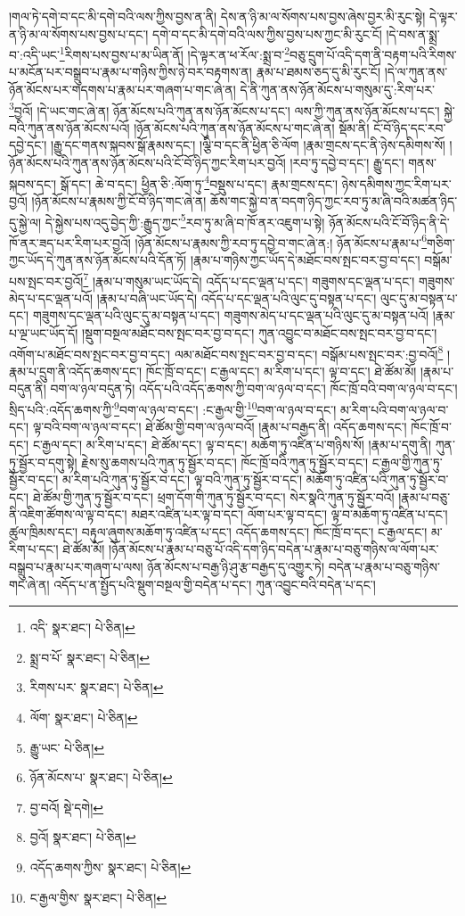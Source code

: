།གལ་ཏེ་དགེ་བ་དང་མི་དགེ་བའི་ལས་ཀྱིས་བྱས་ན་ནི། དེས་ན་ཉི་མ་ལ་སོགས་པས་བྱས་ཞེས་བྱར་མི་རུང་སྟེ། དེ་ལྟར་ན་ཉི་མ་ལ་སོགས་པས་བྱས་པ་དང་། དགེ་བ་དང་མི་དགེ་བའི་ལས་ཀྱིས་བྱས་པས་ཀྱང་མི་རུང་ངོ། །དེ་བས་ན་སྨྲ་བ་:འདི་ཡང་\footnote{འདི་  སྣར་ཐང་།  པེ་ཅིན། }རིགས་པས་བྱས་པ་མ་ཡིན་ནོ། །དེ་ལྟར་ན་ཕ་རོལ་:སྨྲ་བ་\footnote{སྨྲ་བ་པོ་  སྣར་ཐང་།  པེ་ཅིན། }བཅུ་དྲུག་པོ་འདི་དག་ནི་བརྟག་པའི་རིགས་པ་མངོན་པར་བསྒྲུབ་པ་རྣམ་པ་གཉིས་ཀྱིས་ཉེ་བར་བརྟགས་ན། རྣམ་པ་ཐམས་ཅད་དུ་མི་རུང་ངོ། །དེ་ལ་ཀུན་ནས་ཉོན་མོངས་པར་གདགས་པ་རྣམ་པར་གཞག་པ་གང་ཞེ་ན། དེ་ནི་ཀུན་ནས་ཉོན་མོངས་པ་གསུམ་དུ་:རིག་པར་\footnote{རིགས་པར་  སྣར་ཐང་།  པེ་ཅིན། }བྱའོ། །དེ་ཡང་གང་ཞེ་ན། ཉོན་མོངས་པའི་ཀུན་ནས་ཉོན་མོངས་པ་དང་། ལས་ཀྱི་ཀུན་ནས་ཉོན་མོངས་པ་དང་། སྐྱེ་བའི་ཀུན་ནས་ཉོན་མོངས་པའོ། །ཉོན་མོངས་པའི་ཀུན་ནས་ཉོན་མོངས་པ་གང་ཞེ་ན། སྡོམ་ནི། ངོ་བོ་ཉིད་དང་རབ་དབྱེ་དང་། །རྒྱུ་དང་གནས་སྐབས་སྒོ་རྣམས་དང་། །ལྕི་བ་དང་ནི་ཕྱིན་ཅི་ལོག །རྣམ་གྲངས་དང་ནི་ཉེས་དམིགས་སོ། །ཉོན་མོངས་པའི་ཀུན་ནས་ཉོན་མོངས་པའི་ངོ་བོ་ཉིད་ཀྱང་རིག་པར་བྱའོ། །རབ་ཏུ་དབྱེ་བ་དང་། རྒྱུ་དང་། གནས་སྐབས་དང་། སྒོ་དང་། ཆེ་བ་དང་། ཕྱིན་ཅི་:ལོག་ཏུ་\footnote{ལོག་  སྣར་ཐང་།  པེ་ཅིན། }བསྡུས་པ་དང་། རྣམ་གྲངས་དང་། ཉེས་དམིགས་ཀྱང་རིག་པར་བྱའོ། །ཉོན་མོངས་པ་རྣམས་ཀྱི་ངོ་བོ་ཉིད་གང་ཞེ་ན། ཆོས་གང་སྐྱེ་བ་ན་བདག་ཉིད་ཀྱང་རབ་ཏུ་མ་ཞི་བའི་མཚན་ཉིད་དུ་སྐྱེ་ལ། དེ་སྐྱེས་པས་འདུ་བྱེད་ཀྱི་:རྒྱུད་ཀྱང་\footnote{རྒྱུ་ཡང་  པེ་ཅིན། }རབ་ཏུ་མ་ཞི་བ་ཁོ་ནར་འཇུག་པ་སྟེ། ཉོན་མོངས་པའི་ངོ་བོ་ཉིད་ནི་དེ་ཁོ་ནར་ཟད་པར་རིག་པར་བྱའོ། །ཉོན་མོངས་པ་རྣམས་ཀྱི་རབ་ཏུ་དབྱེ་བ་གང་ཞེ་ན:། ཉོན་མོངས་པ་རྣམ་པ་\footnote{ཉོན་མོངས་པ་  སྣར་ཐང་།  པེ་ཅིན། }གཅིག་ཀྱང་ཡོད་དེ་ཀུན་ནས་ཉོན་མོངས་པའི་དོན་ཏོ། །རྣམ་པ་གཉིས་ཀྱང་ཡོད་དེ་མཐོང་བས་སྤང་བར་བྱ་བ་དང་། བསྒོམ་པས་སྤང་བར་བྱའོ།\footnote{བྱ་བའོ།  སྡེ་དགེ། } །རྣམ་པ་གསུམ་ཡང་ཡོད་དེ། འདོད་པ་དང་ལྡན་པ་དང་། གཟུགས་དང་ལྡན་པ་དང་། གཟུགས་མེད་པ་དང་ལྡན་པའོ། །རྣམ་པ་བཞི་ཡང་ཡོད་དེ། འདོད་པ་དང་ལྡན་པའི་ལུང་དུ་བསྟན་པ་དང་། ལུང་དུ་མ་བསྟན་པ་དང་། གཟུགས་དང་ལྡན་པའི་ལུང་དུ་མ་བསྟན་པ་དང་། གཟུགས་མེད་པ་དང་ལྡན་པའི་ལུང་དུ་མ་བསྟན་པའོ། །རྣམ་པ་ལྔ་ཡང་ཡོད་དོ། །སྡུག་བསྔལ་མཐོང་བས་སྤང་བར་བྱ་བ་དང་། ཀུན་འབྱུང་བ་མཐོང་བས་སྤང་བར་བྱ་བ་དང་། འགོག་པ་མཐོང་བས་སྤང་བར་བྱ་བ་དང་། ལམ་མཐོང་བས་སྤང་བར་བྱ་བ་དང་། བསྒོམ་པས་སྤང་བར་:བྱ་བའོ།\footnote{བྱའོ།  སྣར་ཐང་།  པེ་ཅིན། } །རྣམ་པ་དྲུག་ནི་འདོད་ཆགས་དང་། ཁོང་ཁྲོ་བ་དང་། ང་རྒྱལ་དང་། མ་རིག་པ་དང་། ལྟ་བ་དང་། ཐེ་ཚོམ་མོ། །རྣམ་པ་བདུན་ནི། བག་ལ་ཉལ་བདུན་ཏེ། འདོད་པའི་འདོད་ཆགས་ཀྱི་བག་ལ་ཉལ་བ་དང་། ཁོང་ཁྲོ་བའི་བག་ལ་ཉལ་བ་དང་། སྲིད་པའི་:འདོད་ཆགས་ཀྱི་\footnote{འདོད་ཆགས་ཀྱིས་  སྣར་ཐང་།  པེ་ཅིན། }བག་ལ་ཉལ་བ་དང་། :ང་རྒྱལ་གྱི་\footnote{ང་རྒྱལ་གྱིས་  སྣར་ཐང་།  པེ་ཅིན། }བག་ལ་ཉལ་བ་དང་། མ་རིག་པའི་བག་ལ་ཉལ་བ་དང་། ལྟ་བའི་བག་ལ་ཉལ་བ་དང་། ཐེ་ཚོམ་གྱི་བག་ལ་ཉལ་བའོ། །རྣམ་པ་བརྒྱད་ནི། འདོད་ཆགས་དང་། ཁོང་ཁྲོ་བ་དང་། ང་རྒྱལ་དང་། མ་རིག་པ་དང་། ཐེ་ཚོམ་དང་། ལྟ་བ་དང་། མཆོག་ཏུ་འཛིན་པ་གཉིས་སོ། །རྣམ་པ་དགུ་ནི། ཀུན་ཏུ་སྦྱོར་བ་དགུ་སྟེ། རྗེས་སུ་ཆགས་པའི་ཀུན་ཏུ་སྦྱོར་བ་དང་། ཁོང་ཁྲོ་བའི་ཀུན་ཏུ་སྦྱོར་བ་དང་། ང་རྒྱལ་གྱི་ཀུན་ཏུ་སྦྱོར་བ་དང་། མ་རིག་པའི་ཀུན་ཏུ་སྦྱོར་བ་དང་། ལྟ་བའི་ཀུན་ཏུ་སྦྱོར་བ་དང་། མཆོག་ཏུ་འཛིན་པའི་ཀུན་ཏུ་སྦྱོར་བ་དང་། ཐེ་ཚོམ་གྱི་ཀུན་ཏུ་སྦྱོར་བ་དང་། ཕྲག་དོག་གི་ཀུན་ཏུ་སྦྱོར་བ་དང་། སེར་སྣའི་ཀུན་ཏུ་སྦྱོར་བའོ། །རྣམ་པ་བཅུ་ནི་འཇིག་ཚོགས་ལ་ལྟ་བ་དང་། མཐར་འཛིན་པར་ལྟ་བ་དང་། ལོག་པར་ལྟ་བ་དང་། ལྟ་བ་མཆོག་ཏུ་འཛིན་པ་དང་། ཚུལ་ཁྲིམས་དང་། བརྟུལ་ཞུགས་མཆོག་ཏུ་འཛིན་པ་དང་། འདོད་ཆགས་དང་། ཁོང་ཁྲོ་བ་དང་། ང་རྒྱལ་དང་། མ་རིག་པ་དང་། ཐེ་ཚོམ་མོ། །ཉོན་མོངས་པ་རྣམ་པ་བཅུ་པོ་འདི་དག་ཉིད་བདེན་པ་རྣམ་པ་བཅུ་གཉིས་ལ་ལོག་པར་བསྒྲུབ་པ་རྣམ་པར་གཞག་པ་ལས། ཉོན་མོངས་པ་བརྒྱ་ཉི་ཤུ་རྩ་བརྒྱད་དུ་འགྱུར་ཏེ། བདེན་པ་རྣམ་པ་བཅུ་གཉིས་གང་ཞེ་ན། འདོད་པ་ན་སྤྱོད་པའི་སྡུག་བསྔལ་གྱི་བདེན་པ་དང་། ཀུན་འབྱུང་བའི་བདེན་པ་དང་། 